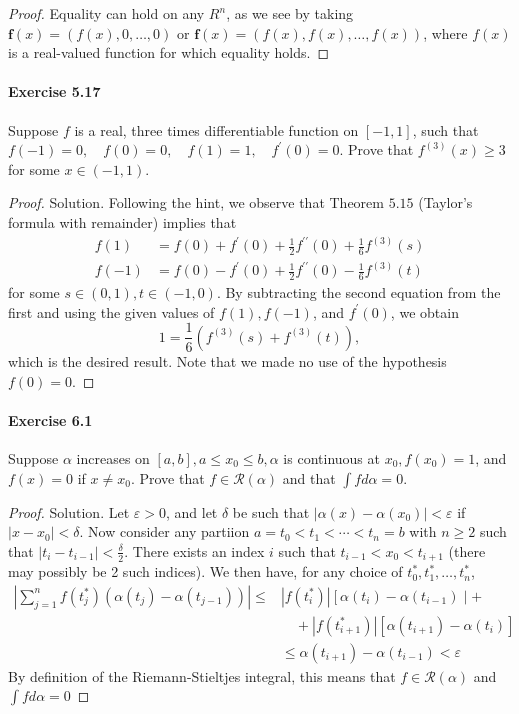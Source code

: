\documentclass{article}
\theoremstyle{definition}
\begin{document}
\begin{proof}
Equality can hold on any $R^n$, as we see by taking $\mathbf{f}(x)=(f(x), 0, \ldots, 0)$ or $\mathbf{f}(x)=(f(x), f(x), \ldots, f(x))$, where $f(x)$ is a real-valued function for which equality holds.

\end{proof}


\paragraph{Exercise 5.17} Suppose $f$ is a real, three times differentiable function on $[-1,1]$, such that $f(-1)=0, \quad f(0)=0, \quad f(1)=1, \quad f^{\prime}(0)=0 .$ Prove that $f^{(3)}(x) \geq 3$ for some $x \in(-1,1)$.
\begin{proof}
    Solution. Following the hint, we observe that Theorem $5.15$ (Taylor's formula with remainder) implies that
$$
\begin{aligned}
f(1) &=f(0)+f^{\prime}(0)+\frac{1}{2} f^{\prime \prime}(0)+\frac{1}{6} f^{(3)}(s) \\
f(-1) &=f(0)-f^{\prime}(0)+\frac{1}{2} f^{\prime \prime}(0)-\frac{1}{6} f^{(3)}(t)
\end{aligned}
$$
for some $s \in(0,1), t \in(-1,0)$. By subtracting the second equation from the first and using the given values of $f(1), f(-1)$, and $f^{\prime}(0)$, we obtain
$$
1=\frac{1}{6}\left(f^{(3)}(s)+f^{(3)}(t)\right),
$$
which is the desired result. Note that we made no use of the hypothesis $f(0)=0$.
\end{proof}


\paragraph{Exercise 6.1} Suppose $\alpha$ increases on $[a, b], a \leq x_{0} \leq b, \alpha$ is continuous at $x_{0}, f\left(x_{0}\right)=1$, and $f(x)=0$ if $x \neq x_{0}$. Prove that $f \in \mathcal{R}(\alpha)$ and that $\int f d \alpha=0$.
\begin{proof}
    Solution. Let $\varepsilon>0$, and let $\delta$ be such that $\left|\alpha(x)-\alpha\left(x_0\right)\right|<\varepsilon$ if $\left|x-x_0\right|<\delta$. Now consider any partiion $a=t_0<t_1<\cdots<t_n=b$ with $n \geq 2$ such that $\left|t_i-t_{i-1}\right|<\frac{\delta}{2}$. There exists an index $i$ such that $t_{i-1}<x_0<t_{i+1}$ (there may possibly be 2 such indices). We then have, for any choice of $t_0^*, t_1^*, \ldots, t_n^*$,
$$
\begin{aligned}
\left|\sum_{j=1}^n f\left(t_j^*\right)\left(\alpha\left(t_j\right)-\alpha\left(t_{j-1}\right)\right)\right| \leq &\left|f\left(t_i^*\right)\right|\left[\alpha\left(t_i\right)-\alpha\left(t_{i-1}\right) \mid+\right.\\
& \quad+\left|f\left(t_{i+1}^*\right)\right|\left[\alpha\left(t_{i+1}\right)-\alpha\left(t_i\right)\right] \\
& \leq \alpha\left(t_{i+1}\right)-\alpha\left(t_{i-1}\right)<\varepsilon
\end{aligned}
$$
By definition of the Riemann-Stieltjes integral, this means that $f \in \mathcal{R}(\alpha)$ and $\int f d \alpha=0$
\end{proof}
\end{document}
